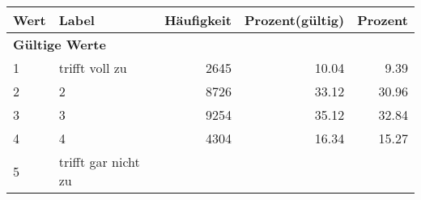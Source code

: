     \begin{longtable}{lXrrr}
     \toprule
     \textbf{Wert} & \textbf{Label} & \textbf{Häufigkeit} & \textbf{Prozent(gültig)} & \textbf{Prozent} \\
     \endhead
     \midrule
     \multicolumn{5}{l}{\textbf{Gültige Werte}}\\

     1 &
     \multicolumn{1}{X}{ trifft voll zu   } &


       \num{2645} &
       \num[round-mode=places,round-precision=2]{10,04} &
         \num[round-mode=places,round-precision=2]{9,39} \\

     2 &
     \multicolumn{1}{X}{ 2   } &


       \num{8726} &
       \num[round-mode=places,round-precision=2]{33,12} &
         \num[round-mode=places,round-precision=2]{30,96} \\

     3 &
     \multicolumn{1}{X}{ 3   } &


       \num{9254} &
       \num[round-mode=places,round-precision=2]{35,12} &
         \num[round-mode=places,round-precision=2]{32,84} \\

     4 &
     \multicolumn{1}{X}{ 4   } &


       \num{4304} &
       \num[round-mode=places,round-precision=2]{16,34} &
         \num[round-mode=places,round-precision=2]{15,27} \\

     5 &
     \multicolumn{1}{X}{ trifft gar nicht zu   } &



\end{longtable}
